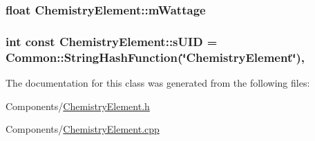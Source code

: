 \subsubsection[{\texorpdfstring{m\+Wattage}{mWattage}}]{\setlength{\rightskip}{0pt plus 5cm}float Chemistry\+Element\+::m\+Wattage\hspace{0.3cm}{\ttfamily [private]}}\hypertarget{classChemistryElement_a757b99b78a73b23791e38116f2a3cd63}{}\label{classChemistryElement_a757b99b78a73b23791e38116f2a3cd63}
\subsubsection[{\texorpdfstring{s\+U\+ID}{sUID}}]{\setlength{\rightskip}{0pt plus 5cm}int const Chemistry\+Element\+::s\+U\+ID = {\bf Common\+::\+String\+Hash\+Function}(\char`\"{}Chemistry\+Element\char`\"{})\hspace{0.3cm}{\ttfamily [static]}, {\ttfamily [private]}}\hypertarget{classChemistryElement_a04615f0f3456f82863c710360bdd8ea1}{}\label{classChemistryElement_a04615f0f3456f82863c710360bdd8ea1}


The documentation for this class was generated from the following files\+:\begin{DoxyCompactItemize}
\item 
Components/\hyperlink{ChemistryElement_8h}{Chemistry\+Element.\+h}\item 
Components/\hyperlink{ChemistryElement_8cpp}{Chemistry\+Element.\+cpp}\end{DoxyCompactItemize}
